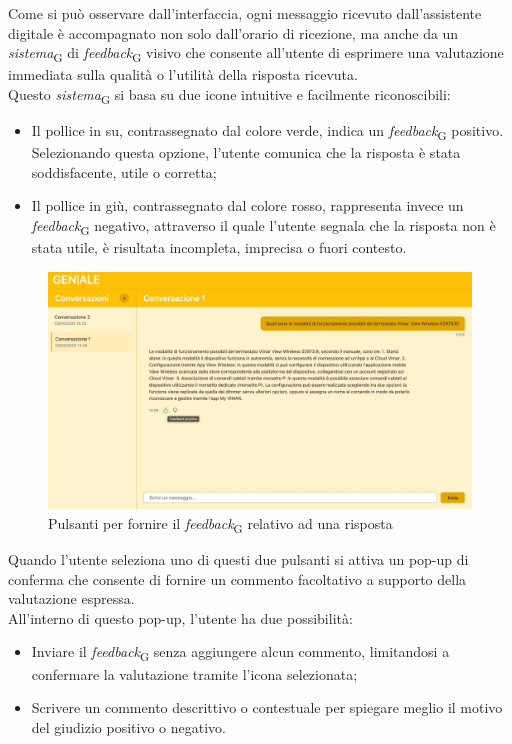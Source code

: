 Come si può osservare dall’interfaccia, ogni messaggio ricevuto dall’assistente digitale è accompagnato non solo dall’orario di ricezione, ma anche da un \textit{sistema}\textsubscript{G} di \textit{feedback}\textsubscript{G} visivo che consente all’utente di esprimere una valutazione immediata sulla qualità o l’utilità della risposta ricevuta. \\
Questo \textit{sistema}\textsubscript{G} si basa su due icone intuitive e facilmente riconoscibili:
\begin{itemize}
    \item Il pollice in su, contrassegnato dal colore verde, indica un \textit{feedback}\textsubscript{G} positivo. Selezionando questa opzione, l’utente comunica che la risposta è stata soddisfacente, utile o corretta;
    \item Il pollice in giù, contrassegnato dal colore rosso, rappresenta invece un \textit{feedback}\textsubscript{G} negativo, attraverso il quale l’utente segnala che la risposta non è stata utile, è risultata incompleta, imprecisa o fuori contesto.
\end{itemize}
\begin{figure}[H]
\centering
\includegraphics[width=1\textwidth]{contents/img/feedback.jpg}
\caption{Pulsanti per fornire il \textit{feedback}\textsubscript{G} relativo ad una risposta}
\end{figure}
Quando l’utente seleziona uno di questi due pulsanti si attiva un pop-up di conferma che consente di fornire un commento facoltativo a supporto della valutazione espressa. \\
All’interno di questo pop-up, l’utente ha due possibilità:
\begin{itemize}
    \item Inviare il \textit{feedback}\textsubscript{G} senza aggiungere alcun commento, limitandosi a confermare la valutazione tramite l’icona selezionata;
    \item Scrivere un commento descrittivo o contestuale per spiegare meglio il motivo del giudizio positivo o negativo.
\end{itemize}
